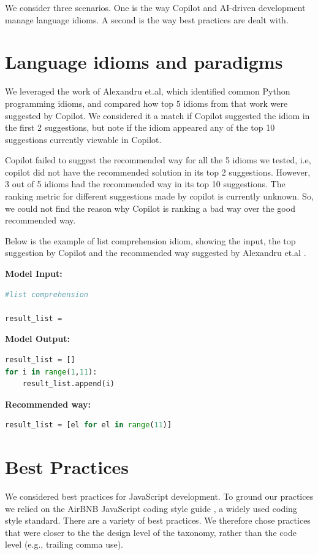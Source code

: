 We consider three scenarios. 
One is the way Copilot and AI-driven development manage language idioms.
A second is the way best practices are dealt with.

\section{Language idioms and paradigms}
We leveraged the work of Alexandru et.al\cite{Alexandru2018}, which identified common Python programming idioms, and compared how top 5 idioms from that work were suggested by Copilot.
We considered it a match if Copilot suggested the idiom in the first 2 suggestions, but note if the idiom appeared any of the top 10 suggestions currently viewable in Copilot. 

Copilot failed to suggest the recommended way for all the 5 idioms we tested, i.e, copilot did not have the recommended solution in its top 2 suggestions. However, 3 out of 5 idioms had the recommended way in its top 10 suggestions. The ranking metric for different suggestions made by copilot is currently unknown. So, we could not find the reason why Copilot is ranking a bad way over the good recommended way.

Below is the example of list comprehension idiom, showing the input, the top suggestion by Copilot and the recommended way suggested by Alexandru et.al \cite{Alexandru2018}.

\begin{tcolorbox}[title=List Comprehension,boxsep=.5mm]
\textbf{Model Input:}
\begin{lstlisting}[language=Python]
#list comprehension

result_list = 
\end{lstlisting}
\tcbline
\textbf{Model Output:}
\begin{lstlisting}[language=Python]
result_list = []
for i in range(1,11):
    result_list.append(i)
\end{lstlisting}
\tcbline
\textbf{Recommended way:}
\begin{lstlisting}[language=Python]
result_list = [el for el in range(11)]
\end{lstlisting}
\end{tcolorbox}

\section{Best Practices}
We considered best practices for JavaScript development. 
To ground our practices we relied on the AirBNB JavaScript coding style guide \cite{airbnb_code}, a widely used coding style standard. 
There are a variety of best practices. 
We therefore chose practices that were closer to the the design level of the taxonomy, rather than the code level (e.g., trailing comma use).

